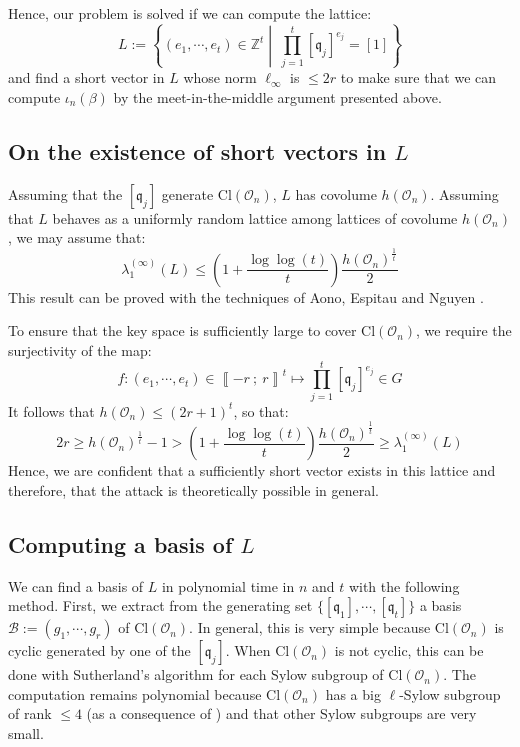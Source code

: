 \documentclass[a4paper,10pt]{article}
\theoremstyle{definition}
\theoremstyle{plain}
\theoremstyle{definition}
\newcommand{\Z}{\mathbb{Z}}
\newcommand{\m}[1]{\mathcal{#1}}
\newcommand{\mO}{\mathcal{O}}
\renewcommand{\i}[2]{\left\llbracket #1~;~#2\right\rrbracket}
\renewcommand{\(}{\left(}
\renewcommand{\)}{\right)}
\newcommand{\mf}[1]{\mathfrak{#1}}
\begin{document}
Hence, our problem is solved if we can compute the lattice:
\[L:=\left\{(e_1,\cdots,e_t)\in\Z^t\middle| \  \prod_{j=1}^t[\mf{q}_j]^{e_j}=[1]\right\}\]
and find a short vector in $L$ whose norm $\ell_\infty$ is $\leq 2r$ to make sure that we can compute $\iota_n(\beta)$ by the meet-in-the-middle argument presented above.  

\subsection{On the existence of short vectors in $L$}

Assuming that the $[\mf{q}_j]$ generate $\mbox{Cl}(\mO_n)$, $L$ has covolume $h(\mO_n)$. Assuming that $L$ behaves as a uniformly random lattice among lattices of covolume $h(\mO_n)$, we may assume that:
\[\lambda_1^{(\infty)}(L)\leq \(1+\frac{\log\log(t)}{t}\)\frac{h(\mO_n)^{\frac{1}{t}}}{2}\]
This result can be proved with the techniques of Aono, Espitau and Nguyen \cite[§ 3]{Aono}.

To ensure that the key space is sufficiently large to cover $\mbox{Cl}(\mO_n)$, we require the surjectivity of the map:
\[f:(e_1,\cdots, e_t)\in\i{-r}{r}^t\longmapsto \prod_{j=1}^t[\mf{q}_j]^{e_j}\in G\]
It follows that $h(\mO_n)\leq (2r+1)^t$, so that:
\[2r\geq h(\mO_n)^{\frac{1}{t}}-1>\(1+\frac{\log\log(t)}{t}\)\frac{h(\mO_n)^{\frac{1}{t}}}{2}\geq \lambda_1^{(\infty)}(L)\]
Hence, we are confident that a sufficiently short vector exists in this lattice and therefore, that the attack is theoretically possible in general.

\subsection{Computing a basis of $L$}

We can find a basis of $L$ in polynomial time in $n$ and $t$ with the following method. First, we extract from the generating set $\{[\mf{q}_1],\cdots, [\mf{q}_t]\}$ a basis $\m{B}:=(g_1, \cdots, g_r)$ of $\mbox{Cl}(\mO_n)$. In general, this is very simple because $\mbox{Cl}(\mO_n)$ is cyclic generated by one of the $[\mf{q}_j]$. When $\mbox{Cl}(\mO_n)$ is not cyclic, this can be done with Sutherland's algorithm \cite[algorithm 4]{Sutherland2010} for each Sylow subgroup of $\mbox{Cl}(\mO_n)$. The computation remains polynomial because $\mbox{Cl}(\mO_n)$ has a big $\ell$-Sylow subgroup of rank $\leq 4$ (as a consequence of \cite[theorem 4.2.10]{Cohen2}) and that other Sylow subgroups are very small.
\end{document}
